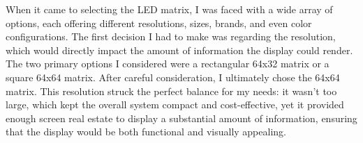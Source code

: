 When it came to selecting the LED matrix, I was faced with a wide array of options, each offering different resolutions, sizes, brands, and even color configurations. The first decision I had to make was regarding the resolution, which would directly impact the amount of information the display could render. The two primary options I considered were a rectangular 64x32 matrix or a square 64x64 matrix. After careful consideration, I ultimately chose the 64x64 matrix. This resolution struck the perfect balance for my needs: it wasn't too large, which kept the overall system compact and cost-effective, yet it provided enough screen real estate to display a substantial amount of information, ensuring that the display would be both functional and visually appealing.